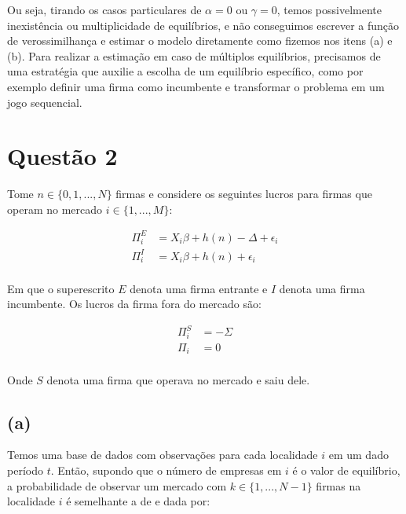 \documentclass{article}
\begin{document}
\vspace{5mm}

Ou seja, tirando os casos particulares de $\alpha = 0$ ou $\gamma = 0$, temos possivelmente inexistência ou multiplicidade de equilíbrios, e não conseguimos escrever a função de verossimilhança e estimar o modelo diretamente como fizemos nos itens (a) e (b). Para realizar a estimação em caso de múltiplos equilíbrios, precisamos de uma estratégia que auxilie a escolha de um equilíbrio específico, como por exemplo definir uma firma como incumbente e transformar o problema em um jogo sequencial.

\section*{Questão 2}

Tome $n \in \{0, 1, ..., N\}$ firmas e considere os seguintes lucros para firmas que operam no mercado $i \in \{1, ..., M\}$:

\begin{equation*}
\begin{aligned}
    \Pi_i^E&=X_i\beta+h(n)-\Delta+\epsilon_i\\
    \Pi_i^I&=X_i\beta + h(n)+\epsilon_i\\
\end{aligned}
\end{equation*}

Em que o superescrito $E$ denota uma firma entrante e $I$ denota uma firma incumbente. Os lucros da firma fora do mercado são:

\begin{equation*}
\begin{aligned}
    \Pi_i^S&=-\Sigma\\
    \Pi_i&=0\\
\end{aligned}
\end{equation*}

Onde $S$ denota uma firma que operava no mercado e saiu dele.

\subsection*{(a)}

Temos uma base de dados com observações para cada localidade $i$ em um dado período $t$. Então, supondo que o número de empresas em $i$ é o valor de equilíbrio, a probabilidade de observar um mercado com $k \in \{1,...,N-1\}$ firmas na localidade $i$ é semelhante a de  e dada por:
\end{document}
